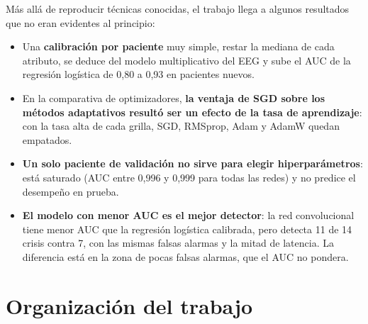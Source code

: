 Más allá de reproducir técnicas conocidas, el trabajo llega a algunos resultados que no eran evidentes al principio:
\begin{itemize}
  \item Una \textbf{calibración por paciente} muy simple, restar la mediana de cada atributo, se deduce del modelo
        multiplicativo del EEG y sube el AUC de la regresión logística de 0,80 a 0,93 en pacientes nuevos.
  \item En la comparativa de optimizadores, \textbf{la ventaja de SGD sobre los métodos adaptativos resultó ser un efecto de la
        tasa de aprendizaje}: con la tasa alta de cada grilla, SGD, RMSprop, Adam y AdamW quedan empatados.
  \item \textbf{Un solo paciente de validación no sirve para elegir hiperparámetros}: está saturado (AUC entre 0,996 y 0,999
        para todas las redes) y no predice el desempeño en prueba.
  \item \textbf{El modelo con menor AUC es el mejor detector}: la red convolucional tiene menor AUC que la regresión logística
        calibrada, pero detecta 11 de 14 crisis contra 7, con las mismas falsas alarmas y la mitad de latencia. La
        diferencia está en la zona de pocas falsas alarmas, que el AUC no pondera.
\end{itemize}

\section{Organización del trabajo}

